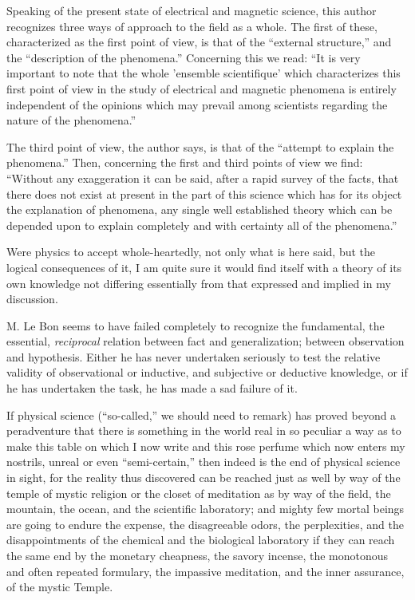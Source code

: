 \documentclass[a4paper, 11pt, oneside, polutonikogreek, english]{article}
\begin{document}
Speaking of the present state of electrical and magnetic science, this author recognizes three ways of approach to the field as a whole. The first of these, characterized as the first point of view, is that of the ``external structure,'' and the ``description of the phenomena.'' Concerning this we read: ``It is very important to note that the whole 'ensemble scientifique' which characterizes this first point of view in the study of electrical and magnetic phenomena is entirely independent of the opinions which may prevail among scientists regarding the nature of the phenomena.''

The third point of view, the author says, is that of the ``attempt to explain the phenomena.'' Then, concerning the first and third points of view we find: ``Without any exaggeration it can be said, after a rapid survey of the facts, that there does not exist at present in the part of this science which has for its object the explanation of phenomena, any single well established theory which can be depended upon to explain completely and with certainty all of the phenomena.''

Were physics to accept whole-heartedly, not only what is here said, but the logical consequences of it, I am quite sure it would find itself with a theory of its own knowledge not differing essentially from that expressed and implied in my discussion.

M. Le Bon seems to have failed completely to recognize the fundamental, the essential, \emph{reciprocal} relation between fact and generalization; between observation and hypothesis. Either he has never undertaken seriously to test the relative validity of observational or inductive, and subjective or deductive knowledge, or if he has undertaken the task, he has made a sad failure of it.

If physical science (``so-called,'' we should need to remark) has proved beyond a peradventure that there is something in the world real in so peculiar a way as to make this table on which I now write and this rose perfume which now enters my nostrils, unreal or even ``semi-certain,'' then indeed is the end of physical science in sight, for the reality thus discovered can be reached just as well by way of the temple of mystic religion or the closet of meditation as by way of the field, the mountain, the ocean, and the scientific laboratory; and mighty few mortal beings are going to endure the expense, the disagreeable odors, the perplexities, and the disappointments of the chemical and the biological laboratory if they can reach the same end by the monetary cheapness, the savory incense, the monotonous and often repeated formulary, the impassive meditation, and the inner assurance, of the mystic Temple.
\end{document}
